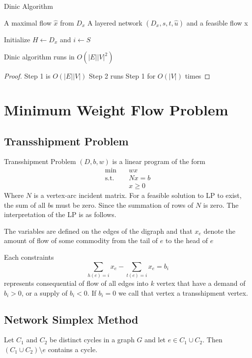 			\begin{algorithm}
				\caption{Dinic Algorithm}
				\begin{algorithmic}
					\ENSURE A maximal flow $\hat{x}$ from $D_x$
					\REQUIRE A layered network $(D_x, s, t, \hat{u})$ and a feasible flow x

					\STATE Initialize $H\gets D_x$ and $i\gets S$
				\end{algorithmic}
			\end{algorithm}

			\begin{theorem}
				Dinic algorithm runs in $O(|E||V|^2)$
			\end{theorem}

			\begin{proof}
				Step 1 is $O(|E||V|)$
				Step 2 runs Step 1 for $O(|V|)$ times
			\end{proof}

	\chapter{Minimum Weight Flow Problem}
		\section{Transshipment Problem}
			Transshipment Problem $(D, b, w)$ is a linear program of the form
			\begin{align}
				\min \quad & wx\\
				\text{s.t.} \quad & Nx = b\\
								  & x \ge 0
			\end{align}
			Where $N$ is a vertex-arc incident matrix. For a feasible solution to LP to exist, the sum of all $b$s must be zero. Since the summation of rows of $N$ is zero. The interpretation of the LP is as follows.

			The variables are defined on the edges of the digraph and that $x_e$ denote the amount of flow of some commodity from the tail of $e$ to the head of $e$

			Each constraints
			\begin{equation}
				\sum_{h(e) = i} x_e - \sum_{t(e) = i}x_e = b_i
			\end{equation}
			represents consequential of flow of all edges into $k$ vertex that have a demand of $b_i > 0$, or a supply of $b_i < 0$. If $b_i = 0$ we call that vertex a transshipment vertex.

		\section{Network Simplex Method}
			\begin{lemma}
				Let $C_1$ and $C_2$ be distinct cycles in a graph $G$ and let $e\in C_1 \cup C_2$. Then $(C_1 \cup C_2) \setminus e$ contains a cycle.
			\end{lemma}

